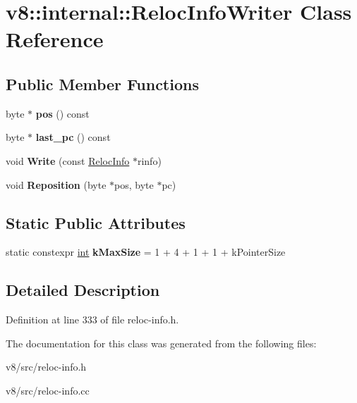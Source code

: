 \hypertarget{classv8_1_1internal_1_1RelocInfoWriter}{}\section{v8\+:\+:internal\+:\+:Reloc\+Info\+Writer Class Reference}
\label{classv8_1_1internal_1_1RelocInfoWriter}
\subsection*{Public Member Functions}
\begin{DoxyCompactItemize}
\item 
\mbox{\label{classv8_1_1internal_1_1RelocInfoWriter_a77e9d26807c7e2d84f6ef88cc724b30b}} 
byte $\ast$ {\bfseries pos} () const
\item 
\mbox{\label{classv8_1_1internal_1_1RelocInfoWriter_ad89cec74cad22ab5a76e6e2d5ded8ba7}} 
byte $\ast$ {\bfseries last\+\_\+pc} () const
\item 
\mbox{\label{classv8_1_1internal_1_1RelocInfoWriter_af938dfa63cdcaf3a4768be549359a81d}} 
void {\bfseries Write} (const \mbox{\hyperlink{classv8_1_1internal_1_1RelocInfo}{Reloc\+Info}} $\ast$rinfo)
\item 
\mbox{\label{classv8_1_1internal_1_1RelocInfoWriter_a2d137c5b37e2bc9577f6c5290fecc496}} 
void {\bfseries Reposition} (byte $\ast$pos, byte $\ast$pc)
\end{DoxyCompactItemize}
\subsection*{Static Public Attributes}
\begin{DoxyCompactItemize}
\item 
\mbox{\label{classv8_1_1internal_1_1RelocInfoWriter_afa14a56499d45cd481e65822606d8aa5}} 
static constexpr \mbox{\hyperlink{classint}{int}} {\bfseries k\+Max\+Size} = 1 + 4 + 1 + 1 + k\+Pointer\+Size
\end{DoxyCompactItemize}


\subsection{Detailed Description}


Definition at line 333 of file reloc-\/info.\+h.



The documentation for this class was generated from the following files\+:\begin{DoxyCompactItemize}
\item 
v8/src/reloc-\/info.\+h\item 
v8/src/reloc-\/info.\+cc\end{DoxyCompactItemize}
